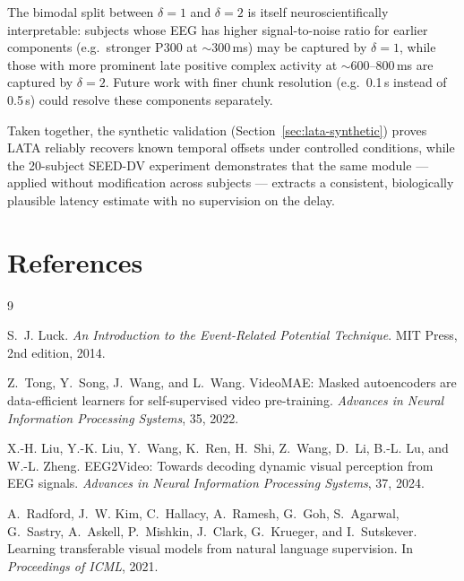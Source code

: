 \documentclass[11pt]{article}
\begin{document}
The bimodal split between $\delta{=}1$ and $\delta{=}2$ is itself
neuroscientifically interpretable: subjects whose EEG has higher
signal-to-noise ratio for earlier components (e.g.\ stronger P300 at
$\sim$300\,ms) may be captured by $\delta{=}1$, while those with more
prominent late positive complex activity at $\sim$600--800\,ms are captured
by $\delta{=}2$.
Future work with finer chunk resolution (e.g.\ 0.1\,s instead of 0.5\,s)
could resolve these components separately.

Taken together, the synthetic validation (Section~\ref{sec:lata-synthetic})
proves LATA reliably recovers known temporal offsets under controlled
conditions, while the 20-subject SEED-DV experiment demonstrates that the
same module — applied without modification across subjects — extracts a
consistent, biologically plausible latency estimate with no supervision
on the delay.

\section*{References}

\begin{thebibliography}{9}

S.~J. Luck.
\newblock \emph{An Introduction to the Event-Related Potential Technique}.
\newblock MIT Press, 2nd edition, 2014.

Z.~Tong, Y.~Song, J.~Wang, and L.~Wang.
\newblock VideoMAE: Masked autoencoders are data-efficient learners for
  self-supervised video pre-training.
\newblock \emph{Advances in Neural Information Processing Systems}, 35,
  2022.

X.-H. Liu, Y.-K. Liu, Y.~Wang, K.~Ren, H.~Shi, Z.~Wang, D.~Li, B.-L. Lu,
  and W.-L. Zheng.
\newblock EEG2Video: Towards decoding dynamic visual perception from EEG
  signals.
\newblock \emph{Advances in Neural Information Processing Systems}, 37,
  2024.

A.~Radford, J.~W. Kim, C.~Hallacy, A.~Ramesh, G.~Goh, S.~Agarwal,
  G.~Sastry, A.~Askell, P.~Mishkin, J.~Clark, G.~Krueger, and I.~Sutskever.
\newblock Learning transferable visual models from natural language
  supervision.
\newblock In \emph{Proceedings of ICML}, 2021.

\end{thebibliography}
\end{document}
